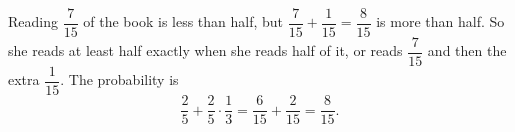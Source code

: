 Reading $\dfrac{7}{15}$ of the book is less than half, but $\dfrac{7}{15}+\dfrac{1}{15}=\dfrac{8}{15}$ is more than half. So she reads at least half exactly when she reads half of it, or reads $\dfrac{7}{15}$ and then the extra $\dfrac{1}{15}$. The probability is
\[\dfrac25+\dfrac25\cdot\dfrac13=\dfrac{6}{15}+\dfrac{2}{15}=\boxed{\dfrac{8}{15}}.\]
